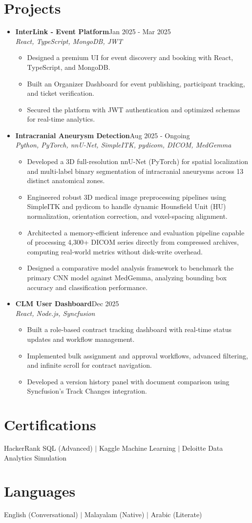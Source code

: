 \documentclass[letterpaper,10pt]{article}
\newcommand{\resumeItem}[1]{
  \item\small{
    {#1 \vspace{-2pt}}
  }
}
\newcommand{\resumeProjectHeading}[3]{
    \item
    \small \textbf{#1}\hfill #2 \\
    \small \emph{#3}
    \vspace{-7pt}
}
\newcommand{\resumeSubHeadingListStart}{\begin{itemize}[leftmargin=0.15in, label={}, itemsep=0pt, topsep=2pt]}
\newcommand{\resumeSubHeadingListEnd}{\end{itemize}}
\newcommand{\resumeItemListStart}{\begin{itemize}[itemsep=0pt, topsep=1pt]}
\newcommand{\resumeItemListEnd}{\end{itemize}\vspace{-7pt}}
\begin{document}
\section{Projects}
    \resumeSubHeadingListStart
      \resumeProjectHeading
          {InterLink - Event Platform}{Jan 2025 - Mar 2025}{React, TypeScript, MongoDB, JWT}
          \resumeItemListStart
            \resumeItem{Designed a premium UI for event discovery and booking with React, TypeScript, and MongoDB.}
            \resumeItem{Built an Organizer Dashboard for event publishing, participant tracking, and ticket verification.}
            \resumeItem{Secured the platform with JWT authentication and optimized schemas for real-time analytics.}
          \resumeItemListEnd
      \resumeProjectHeading
          {Intracranial Aneurysm Detection}{Aug 2025 - Ongoing}{Python, PyTorch, nnU-Net, SimpleITK, pydicom, DICOM, MedGemma}
          \resumeItemListStart
            \resumeItem{Developed a 3D full-resolution nnU-Net (PyTorch) for spatial localization and multi-label binary segmentation of intracranial aneurysms across 13 distinct anatomical zones.}
            \resumeItem{Engineered robust 3D medical image preprocessing pipelines using SimpleITK and pydicom to handle dynamic Hounsfield Unit (HU) normalization, orientation correction, and voxel-spacing alignment.}
            \resumeItem{Architected a memory-efficient inference and evaluation pipeline capable of processing 4,300+ DICOM series directly from compressed archives, computing real-world metrics without disk-write overhead.}
            \resumeItem{Designed a comparative model analysis framework to benchmark the primary CNN model against MedGemma, analyzing bounding box accuracy and classification performance.}
          \resumeItemListEnd
      \resumeProjectHeading
          {CLM User Dashboard}{Dec 2025}{React, Node.js, Syncfusion}
          \resumeItemListStart
            \resumeItem{Built a role-based contract tracking dashboard with real-time status updates and workflow management.}
            \resumeItem{Implemented bulk assignment and approval workflows, advanced filtering, and infinite scroll for contract navigation.}
            \resumeItem{Developed a version history panel with document comparison using Syncfusion's Track Changes integration.}
          \resumeItemListEnd
    \resumeSubHeadingListEnd

\section{Certifications}
 \begin{itemize}[leftmargin=0.15in, label={}]
    \small{\item{HackerRank SQL (Advanced) $|$ Kaggle Machine Learning $|$ Deloitte Data Analytics Simulation}}
 \end{itemize}

\section{Languages}
 \begin{itemize}[leftmargin=0.15in, label={}]
    \small{\item{English (Conversational) $|$ Malayalam (Native) $|$ Arabic (Literate)}}
 \end{itemize}
\end{document}
